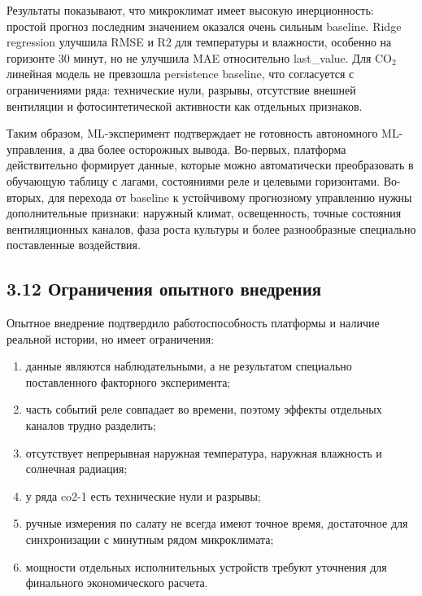 \documentclass[a4paper,14pt]{extarticle}
\renewcommand{\texttt}[1]{\textnormal{#1}}
\providecommand{\tightlist}{%
  \setlength{\itemsep}{0pt}\setlength{\parskip}{0pt}}
\begin{document}
Результаты показывают, что микроклимат имеет высокую инерционность:
простой прогноз последним значением оказался очень сильным baseline.
Ridge regression улучшила RMSE и R2 для температуры и влажности,
особенно на горизонте 30 минут, но не улучшила MAE относительно
\texttt{last\_value}. Для CO\(_2\) линейная модель не превзошла
persistence baseline, что согласуется с ограничениями ряда: технические
нули, разрывы, отсутствие внешней вентиляции и фотосинтетической
активности как отдельных признаков.

Таким образом, ML-эксперимент подтверждает не готовность автономного
ML-управления, а два более осторожных вывода. Во-первых, платформа
действительно формирует данные, которые можно автоматически
преобразовать в обучающую таблицу с лагами, состояниями реле и целевыми
горизонтами. Во-вторых, для перехода от baseline к устойчивому
прогнозному управлению нужны дополнительные признаки: наружный климат,
освещенность, точные состояния вентиляционных каналов, фаза роста
культуры и более разнообразные специально поставленные воздействия.

\subsection{3.12 Ограничения опытного
внедрения}\label{ux43eux433ux440ux430ux43dux438ux447ux435ux43dux438ux44f-ux43eux43fux44bux442ux43dux43eux433ux43e-ux432ux43dux435ux434ux440ux435ux43dux438ux44f}

Опытное внедрение подтвердило работоспособность платформы и наличие
реальной истории, но имеет ограничения:

\begin{enumerate}
\def\labelenumi{\arabic{enumi})}
\tightlist
\item
  данные являются наблюдательными, а не результатом специально
  поставленного факторного эксперимента;
\item
  часть событий реле совпадает во времени, поэтому эффекты отдельных
  каналов трудно разделить;
\item
  отсутствует непрерывная наружная температура, наружная влажность и
  солнечная радиация;
\item
  у ряда \texttt{co2-1} есть технические нули и разрывы;
\item
  ручные измерения по салату не всегда имеют точное время, достаточное
  для синхронизации с минутным рядом микроклимата;
\item
  мощности отдельных исполнительных устройств требуют уточнения для
  финального экономического расчета.
\end{enumerate}
\end{document}

